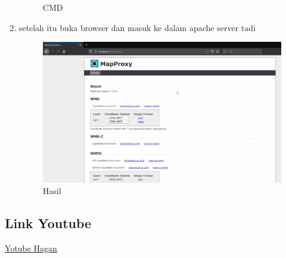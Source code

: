 \begin{enumerate}
\begin{figure}[H]
		\centering
		\caption{CMD}
	\end{figure}
    \item setelah itu buka browser dan masuk ke dalam apache server tadi
    \hfill\break
    \begin{figure}[H]
		\includegraphics[width=12cm]{figures/1174040/Python3/browser.PNG}
		\centering
		\caption{Hasil}
	\end{figure}
\end{enumerate}    
\subsection{Link Youtube}
\href{https://www.youtube.com/watch?v=8aFRr9DbjQ8}{Yotube Hagan}